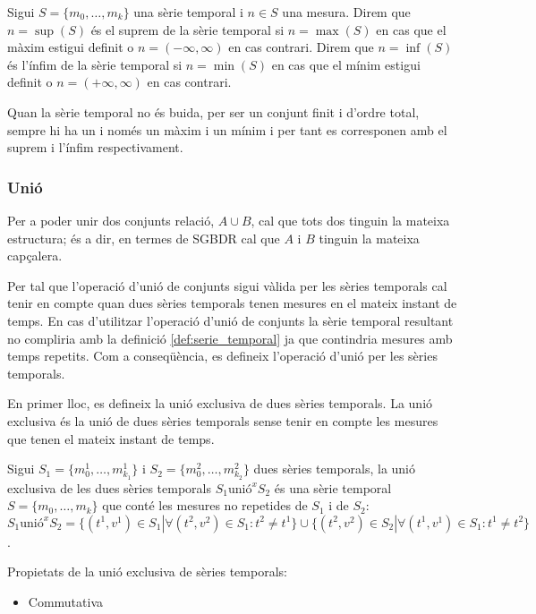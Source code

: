 \begin{definition}
  Sigui $S=\{m_0,\ldots,m_k\}$ una sèrie temporal i $n\in S$ una
  mesura.  Direm que $n=\sup(S)$ és el suprem de la sèrie temporal si
  $n=\max(S)$ en cas que el màxim estigui definit o
  $n=(-\infty,\infty)$ en cas contrari.  Direm que $n=\inf(S)$ és
  l'ínfim de la sèrie temporal si $n=\min(S)$ en cas que el mínim
  estigui definit o $n=(+\infty,\infty)$ en cas contrari.
\end{definition}

Quan la sèrie temporal no és buida, per
ser un conjunt finit i d'ordre total, sempre hi ha un i només un màxim
i un mínim i per tant es corresponen amb el suprem i l'ínfim
respectivament.




\subsubsection{Unió}

Per a poder unir dos conjunts relació, $A \cup B$, cal que tots dos
tinguin la mateixa estructura; és a dir, en termes de SGBDR cal que
$A$ i $B$ tinguin la mateixa capçalera.


Per tal que l'operació d'unió de conjunts sigui vàlida per les sèries
temporals cal tenir en compte quan dues sèries temporals tenen mesures
en el mateix instant de temps. En cas d'utilitzar l'operació d'unió de
conjunts la sèrie temporal resultant no compliria amb la definició
\ref{def:serie_temporal} ja que contindria mesures amb temps
repetits. Com a conseqüència, es defineix l'operació d'unió per les
sèries temporals.


En primer lloc, es defineix la unió exclusiva de dues sèries temporals.  La
unió exclusiva és la unió de dues sèries temporals sense tenir en
compte les mesures que tenen el mateix instant de temps.

\begin{definition}
  Sigui $S_1=\{m_0^1, \dotsc, m_{k_1}^1\}$ i $S_2=\{m_0^2, \dotsc,
  m_{k_2}^2\}$ dues sèries temporals, la unió exclusiva de les dues
  sèries temporals $S_1 \text{unió}^x S_2$ és una sèrie temporal
  $S=\{m_0, \dotsc, m_k\}$ que conté les mesures no repetides de $S_1$
  i de $S_2$: $S_1 \text{unió}^x S_2 = \{ (t^1,v^1) \in S_1 | \forall
  (t^2,v^2)\in S_1 : t^2 \neq t^1 \} \cup \{ (t^2,v^2) \in S_2 |
  \forall (t^1,v^1)\in S_1 : t^1 \neq t^2 \}$.
\end{definition}

Propietats de la unió exclusiva de sèries temporals:
\begin{itemize}
\item Commutativa
\end{itemize}


